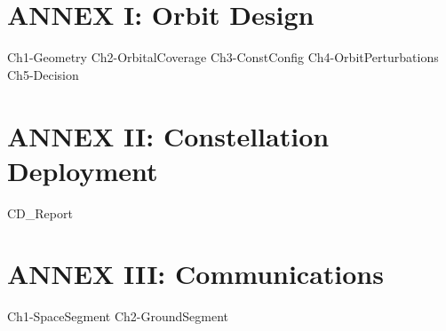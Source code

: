 % 
%





\setlength{\parindent}{0pt}

\usepackage{epigraph}
\usepackage{tocloft}




\newpage\thispagestyle{EmptyPage}
\mbox{}\newpage


\setcounter{tocdepth}{3}
\tableofcontents
\pagebreak

\renewcommand{\cfttabnumwidth}{4em}
\listoftables
\pagebreak

\renewcommand{\cftfignumwidth}{4em}
\listoffigures



\newpage
{}

\newpage
\setlength{\parskip}{1em}



\part{ANNEX I: Orbit Design}
{Ch1-Geometry}
{Ch2-OrbitalCoverage}
{Ch3-ConstConfig}
{Ch4-OrbitPerturbations}
{Ch5-Decision}

\part{ANNEX II: Constellation Deployment}
{CD_Report}

\part{ANNEX III: Communications}
{Ch1-SpaceSegment}
{Ch2-GroundSegment}

